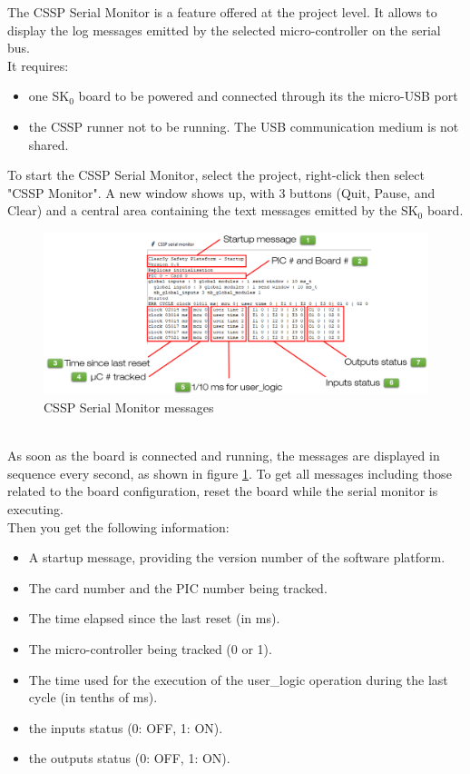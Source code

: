 The CSSP Serial Monitor is a feature offered at the project level. It allows to display the log messages emitted by the selected micro-controller on the serial bus. \\
It requires:
\begin{itemize}
    \item one SK$_0$ board to be powered and connected through its the micro-USB port
    \item the CSSP runner not to be running. The USB communication medium is not shared.
\end{itemize}
To start the CSSP Serial Monitor, select the project, right-click then select "CSSP Monitor". A new window shows up, with 3 buttons (Quit, Pause, and Clear) and a central area containing the text messages emitted by the SK$_0$ board.
\begin{figure}[h]
\centering\includegraphics[scale=0.30]{Pictures/chapterAnnexes/traces-serial-monitor.png}
\caption{CSSP Serial Monitor messages}
\label{annexes:SK0-serial-monitor}
\end{figure} \\
As soon as the board is connected and running, the messages are displayed in sequence every second, as shown in figure \ref{annexes:SK0-serial-monitor}. To get all messages including those related to the board configuration, reset the board while the serial monitor is executing. \\
Then you get the following information:
\begin{itemize}
    \item A startup message, providing the version number of the software platform.
    \item The card number and the PIC number being tracked.
    \item The time elapsed since the last reset (in ms).
    \item The micro-controller being tracked (0 or 1).
    \item The time used for the execution of the user\_logic operation during the last cycle (in tenths of ms).
    \item the inputs status (0: OFF, 1: ON).
    \item the outputs status (0: OFF, 1: ON).
\end{itemize}

